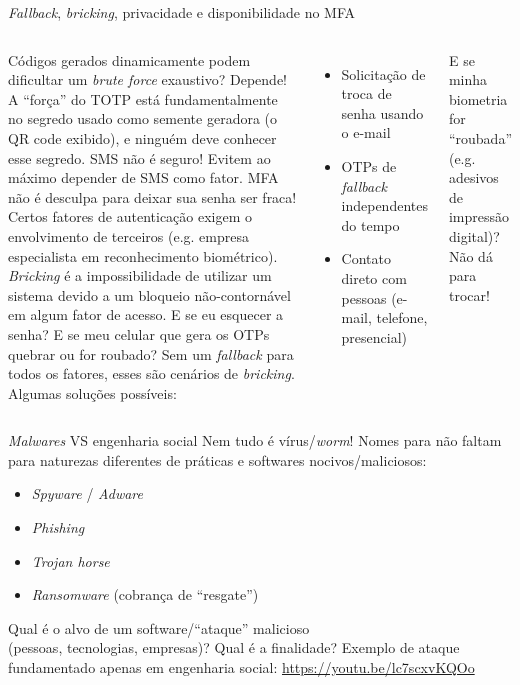\documentclass[utf8]{beamer}
\begin{document}
\begin{frame}{\emph{Fallback}, \emph{bricking},
              privacidade e disponibilidade no MFA}
  \fontsize{10pt}{10pt}\selectfont
  \begin{columns}[c]
    Códigos gerados dinamicamente
    podem dificultar um \emph{brute force} exaustivo?
    \vspace{.5em}\vfill
    Depende!
    A ``força'' do TOTP está fundamentalmente no segredo
    usado como semente geradora (o QR code exibido),
    e ninguém deve conhecer esse segredo.
    \vspace{.5em}\vfill
    SMS não é seguro! Evitem ao máximo depender de SMS como fator.
    \vspace{.5em}\vfill
    MFA não é desculpa para deixar sua senha ser fraca!
    \vspace{.5em}\vfill
    Certos fatores de autenticação
    exigem o envolvimento de terceiros
    (e.g. empresa especialista em reconhecimento biométrico).
    \emph{Bricking} é a impossibilidade de utilizar um sistema
    devido a um bloqueio não-contornável em algum fator de acesso.
    \vspace{.5em}\vfill
    E se eu esquecer a senha?
    E se meu celular que gera os OTPs quebrar ou for roubado?
    Sem um \emph{fallback} para todos os fatores,
    esses são cenários de \emph{bricking}.
    Algumas soluções possíveis:
    \begin{itemize}
      \item Solicitação de troca de senha usando o e-mail
      \item OTPs de \emph{fallback} independentes do tempo
      \item Contato direto com pessoas (e-mail, telefone, presencial)
    \end{itemize}
    \vspace{.5em}\vfill
    E se minha biometria for ``roubada''
    (e.g. adesivos de impressão digital)?
    Não dá para trocar!
  \end{columns}
\end{frame}


\begin{frame}{\emph{Malwares} VS engenharia social}
  Nem tudo é vírus/\emph{worm}!
  Nomes para não faltam
  para naturezas diferentes de práticas e softwares nocivos/maliciosos:
  \begin{itemize}
    \item \emph{Spyware} / \emph{Adware}
    \item \emph{Phishing}
    \item \emph{Trojan horse}
    \item \emph{Ransomware} (cobrança de ``resgate'')
  \end{itemize}
  \vfill
  \centering
  Qual é o alvo de um software/``ataque'' malicioso \\
  (pessoas, tecnologias, empresas)?
  \vfill
  Qual é a finalidade?
  \vfill
  Exemplo de ataque fundamentado apenas em engenharia social:
  \url{https://youtu.be/lc7scxvKQOo}
\end{frame}
\end{document}

